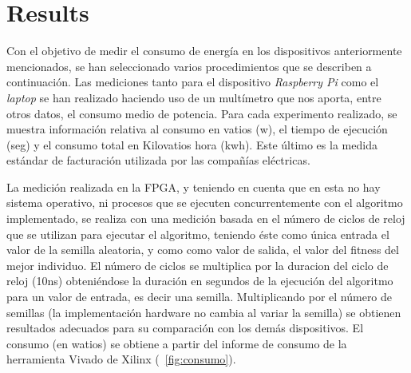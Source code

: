 \section{Results}
\label{results}

Con el objetivo de medir el consumo de energía en los dispositivos anteriormente mencionados, se han seleccionado varios procedimientos que se describen a continuación. Las 
mediciones tanto para el dispositivo \textit{Raspberry Pi} como el \textit{laptop} se han realizado haciendo uso de un multímetro que nos aporta, entre otros datos, el 
consumo medio de potencia. %
Para cada experimento realizado, se muestra información relativa al 
consumo en vatios (w), el tiempo de ejecución (seg) y el consumo total en Kilovatios hora (kwh). Este último es la medida estándar de facturación utilizada por las compañías eléctricas.

La medición realizada en la FPGA, y teniendo en cuenta que en esta no hay sistema operativo, ni procesos que se ejecuten concurrentemente con el algoritmo implementado, se realiza con una medición basada en el número de ciclos de reloj que se utilizan para ejecutar el algoritmo, teniendo éste como única entrada el valor de la semilla aleatoria, y como como valor de salida, el valor del fitness del mejor individuo. El número de ciclos se multiplica por la duracion del ciclo de reloj (10ns) obteniéndose la duración en segundos de la ejecución del algoritmo para un valor de entrada, es decir una semilla. Multiplicando por el número de semillas (la implementación hardware no cambia al variar la semilla) se obtienen resultados adecuados para su comparación con los demás dispositivos. El consumo (en watios) se obtiene a partir del informe de consumo de la herramienta Vivado de Xilinx (~\ref{fig:consumo}). 






